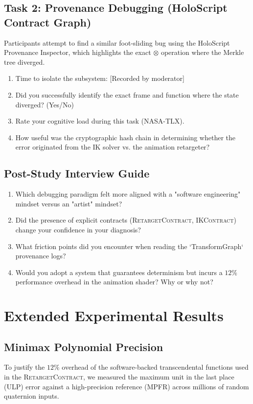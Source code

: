\documentclass[sigconf,nonacm]{acmart}
\newcommand{\retargetcontract}{\textsc{RetargetContract}}
\newcommand{\ikcontract}{\textsc{IKContract}}
\newcommand{\tropmult}{\otimes}
\begin{document}
\subsection{Task 2: Provenance Debugging (HoloScript Contract Graph)}
Participants attempt to find a similar foot-sliding bug using the HoloScript Provenance Inspector, which highlights the exact $\tropmult$ operation where the Merkle tree diverged.
\begin{enumerate}
    \item Time to isolate the subsystem: [Recorded by moderator]
    \item Did you successfully identify the exact frame and function where the state diverged? (Yes/No)
    \item Rate your cognitive load during this task (NASA-TLX).
    \item How useful was the cryptographic hash chain in determining whether the error originated from the IK solver vs. the animation retargeter?
\end{enumerate}

\subsection{Post-Study Interview Guide}
\begin{enumerate}
    \item Which debugging paradigm felt more aligned with a "software engineering" mindset versus an "artist" mindset?
    \item Did the presence of explicit contracts (\retargetcontract{}, \ikcontract{}) change your confidence in your diagnosis?
    \item What friction points did you encounter when reading the `TransformGraph` provenance logs?
    \item Would you adopt a system that guarantees determinism but incurs a $12\%$ performance overhead in the animation shader? Why or why not?
\end{enumerate}

\section{Extended Experimental Results}
\subsection{Minimax Polynomial Precision}
To justify the $12\%$ overhead of the software-backed transcendental functions used in the \retargetcontract{}, we measured the maximum unit in the last place (ULP) error against a high-precision reference (MPFR) across millions of random quaternion inputs.
\end{document}
